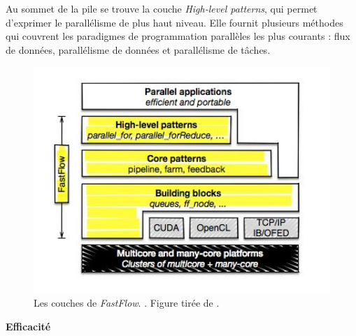 Au sommet de la pile se trouve la couche \emph{High-level patterns}, qui permet d'exprimer le parall\'elisme de plus haut niveau. Elle fournit plusieurs m\'ethodes qui couvrent les paradigmes de programmation parall\`eles les plus courants : flux de donn\'ees, parall\'elisme de donn\'ees et  parall\'elisme de t\^aches. 

\begin{figure}[ht]
\centering
     \includegraphics[width=1.0\textwidth]{Figures/FastFlowLayers.jpg}
      \caption{Les couches de \emph{FastFlow}. . Figure tir\'ee de \cite{AldinucciEtAl14}.}
       \label{FastFlowLayers.fig}
\end{figure}

\textbf{Efficacit\'e}

